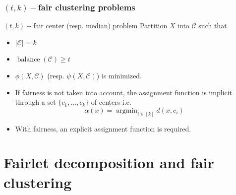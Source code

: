 \documentclass{beamer}
\DeclareMathOperator{\balance}{balance}
\DeclareMathOperator{\argmin}{argmin}
\begin{document}


\begin{frame}
\frametitle{$(t, k)-$fair clustering problems}

\begin{alertblock}{$(t, k)-$fair center (resp. median) problem}
Partition $X$ into $\mathcal{C}$ such that
	\begin{itemize}
		\item $|\mathcal{C}| = k$
		\item $\balance(\mathcal{C}) \geq t$
		\item $\phi(X, \mathcal{C})$ (resp. $\psi(X, \mathcal{C})$) is minimized.
	\end{itemize}
\end{alertblock} \pause

\begin{itemize}
	\item If fairness is not taken into account, the assignment function is implicit through a set $\{c_1, \dots, c_k\}$ of centers i.e.
	$$\alpha(x) = \argmin_{i \in [k]} d(x, c_i)$$ \pause
	\item With fairness, an explicit assignment function is required.
\end{itemize}

\end{frame}


\section{Fairlet decomposition and fair clustering}
\end{document}
